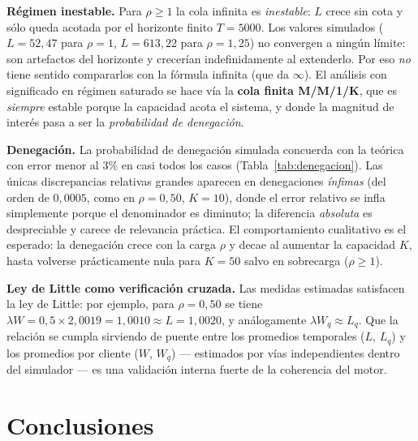 \documentclass[11pt]{article}
\begin{document}
\textbf{R\'egimen inestable.} Para $\rho \ge 1$ la cola infinita es
\emph{inestable}: $L$ crece sin cota y s\'olo queda acotada por el horizonte
finito $T = 5000$. Los valores simulados ($L = 52{,}47$ para $\rho = 1$,
$L = 613{,}22$ para $\rho = 1{,}25$) no convergen a ning\'un l\'imite: son
artefactos del horizonte y crecer\'ian indefinidamente al extenderlo. Por eso
\emph{no} tiene sentido compararlos con la f\'ormula infinita (que da
$\infty$). El an\'alisis con significado en r\'egimen saturado se hace v\'ia la
\textbf{cola finita M/M/1/K}, que es \emph{siempre} estable porque la
capacidad acota el sistema, y donde la magnitud de inter\'es pasa a ser la
\emph{probabilidad de denegaci\'on}.

\textbf{Denegaci\'on.} La probabilidad de denegaci\'on simulada concuerda con
la te\'orica con error menor al $3\%$ en casi todos los casos
(Tabla~\ref{tab:denegacion}). Las \'unicas discrepancias relativas grandes
aparecen en denegaciones \emph{\'infimas} (del orden de $0{,}0005$, como en
$\rho = 0{,}50$, $K = 10$), donde el error relativo se infla simplemente
porque el denominador es diminuto; la diferencia \emph{absoluta} es
despreciable y carece de relevancia pr\'actica. El comportamiento cualitativo
es el esperado: la denegaci\'on crece con la carga $\rho$ y decae al
aumentar la capacidad $K$, hasta volverse pr\'acticamente nula para $K = 50$
salvo en sobrecarga ($\rho \ge 1$).

\textbf{Ley de Little como verificaci\'on cruzada.} Las medidas estimadas
satisfacen la ley de Little: por ejemplo, para $\rho = 0{,}50$ se tiene
$\lambda W = 0{,}5 \times 2{,}0019 = 1{,}0010 \approx L = 1{,}0020$, y
an\'alogamente $\lambda W_q \approx L_q$. Que la relaci\'on se cumpla
sirviendo de puente entre los promedios temporales ($L$, $L_q$) y los
promedios por cliente ($W$, $W_q$) --- estimados por v\'ias independientes
dentro del simulador --- es una validaci\'on interna fuerte de la coherencia
del motor.

\section{Conclusiones}
\end{document}
